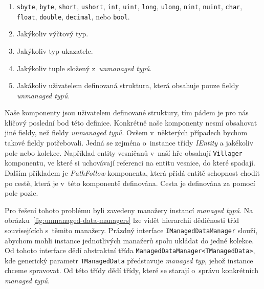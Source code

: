 \begin{enumerate}
  \item \texttt{sbyte}, \texttt{byte}, \texttt{short}, \texttt{ushort}, \texttt{int}, \texttt{uint}, \texttt{long}, \texttt{ulong}, \texttt{nint}, \texttt{nuint}, \texttt{char}, \texttt{float}, \texttt{double}, \texttt{decimal}, nebo \texttt{bool}.

  \item Jakýkoliv výčtový typ.
  
  \item Jakýkoliv typ ukazatele.

  \item Jakýkoliv tuple složený z~\textit{unmanaged typů}.

  \item Jakákoliv uživatelem definovaná struktura, která obsahuje pouze fieldy \textit{unmanaged typů}.
\end{enumerate}

Naše komponenty jsou uživatelem definované struktury, tím pádem je pro nás klíčový poslední bod této definice. Konkrétně naše komponenty nesmí obsahovat jiné fieldy, než fieldy \textit{unmanaged typů}. Ovšem v~některých případech bychom takové fieldy potřebovali. Jedná se zejména o~instance třídy \textit{IEntity} a jakékoliv pole nebo kolekce. Například entity vesničanů v~naší hře obsahují \texttt{Villager} komponentu, ve které si uchovávají referenci na entitu vesnice, do které spadají. Dalším příkladem je \textit{PathFollow} komponenta, která přidá entitě schopnost chodit po cestě, která je v~této komponentě definována. Cesta je definována za pomocí pole pozic.

Pro řešení tohoto problému byli zavedeny manažery instancí \textit{managed typů}. Na obrázku~\ref{fig:unmanaged-data-managers} lze vidět hierarchii dědičnosti tříd souvisejících s~těmito manažery. Prázdný interface \texttt{IManagedDataManager} slouží, abychom mohli instance jednotlivých manažerů spolu ukládat do jedné kolekce. Od tohoto interface dědí abstraktní třída \texttt{ManagedDataManager<TManagedData>}, kde generický parametr \texttt{TManagedData} představuje \textit{managed typ}, jehož instance chceme spravovat. Od této třídy dědí třídy, které se starají o~správu konkrétních \textit{managed typů}.

